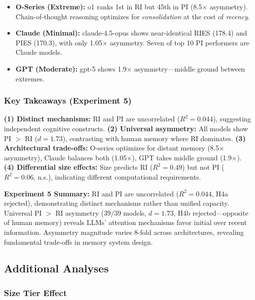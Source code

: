 \documentclass{article}
\begin{document}
\begin{itemize}[itemsep=3pt,topsep=4pt,parsep=0pt]
    \item \textbf{O-Series (Extreme):} o1 ranks 1st in RI but 45th in PI (8.5$\times$ asymmetry). Chain-of-thought reasoning optimizes for \textit{consolidation} at the cost of \textit{recency}.
    \item \textbf{Claude (Minimal):} claude-4.5-opus shows near-identical RIES (178.4) and PIES (170.3), with only 1.05$\times$ asymmetry. Seven of top 10 PI performers are Claude models.
    \item \textbf{GPT (Moderate):} gpt-5 shows 1.9$\times$ asymmetry---middle ground between extremes.
\end{itemize}

\subsubsection{Key Takeaways (Experiment 5)}

\textbf{(1) Distinct mechanisms:} RI and PI are uncorrelated ($R^2 = 0.044$), suggesting independent cognitive constructs.
\textbf{(2) Universal asymmetry:} All models show PI $>$ RI ($d = 1.73$), contrasting with human memory where RI dominates.
\textbf{(3) Architectural trade-offs:} O-series optimizes for distant memory (8.5$\times$ asymmetry), Claude balances both (1.05$\times$), GPT takes middle ground (1.9$\times$).
\textbf{(4) Differential size effects:} Size predicts RI ($R^2 = 0.49$) but not PI ($R^2 = 0.06$, n.s.), indicating different computational requirements.

\textbf{Experiment 5 Summary:} RI and PI are uncorrelated ($R^2 = 0.044$, H4a rejected), demonstrating distinct mechanisms rather than unified capacity. Universal PI $>$ RI asymmetry (39/39 models, $d = 1.73$, H4b rejected---opposite of human memory) reveals LLMs' attention mechanisms favor initial over recent information. Asymmetry magnitude varies 8-fold across architectures, revealing fundamental trade-offs in memory system design.

\subsection{Additional Analyses}
\label{sec:additional}

\subsubsection{Size Tier Effect}
\end{document}
